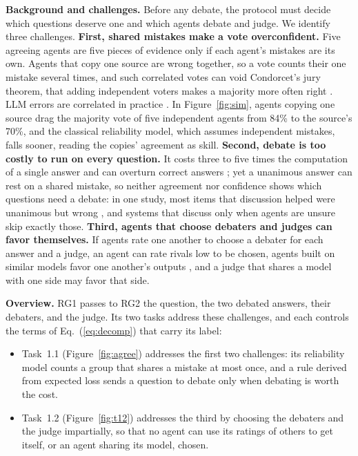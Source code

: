 \documentclass[12pt,letterpaper]{article}
\newcommand{\hd}[1]{\ifhmode\par\fi\addvspace{1pt}\noindent\textbf{#1}\hspace{0.35em}}
\begin{document}
\hd{Background and challenges.} Before any debate, the protocol must decide which questions deserve one and which agents debate and judge. We identify three challenges. \textbf{First, shared mistakes make a vote overconfident.} Five agreeing agents are five pieces of evidence only if each agent's mistakes are its own. Agents that copy one source are wrong together, so a vote counts their one mistake several times, and such correlated votes can void Condorcet's jury theorem, that adding independent voters makes a majority more often right \citep{ladha1992condorcet}. LLM errors are correlated in practice \citep{kim2025correlated,goel2025great,kohli2026nine}. In Figure~\ref{fig:sim}, agents copying one source drag the majority vote of five independent agents from 84\% to the source's 70\%, and the classical reliability model, which assumes independent mistakes, falls sooner, reading the copies' agreement as skill. \textbf{Second, debate is too costly to run on every question.} It costs three to five times the computation of a single answer and can overturn correct answers \citep{fan2026imad}; yet a unanimous answer can rest on a shared mistake, so neither agreement nor confidence shows which questions need a debate: in one study, most items that discussion helped were unanimous but wrong \citep{hu2026scouting}, and systems that discuss only when agents are unsure \citep{eo2025down} skip exactly those. \textbf{Third, agents that choose debaters and judges can favor themselves.} If agents rate one another to choose a debater for each answer and a judge, an agent can rate rivals low to be chosen, agents built on similar models favor one another's outputs \citep{panickssery2024self,goel2025great}, and a judge that shares a model with one side may favor that side.

\hd{Overview.} RG1 passes to RG2 the question, the two debated answers, their debaters, and the judge. Its two tasks address these challenges, and each controls the terms of Eq.~(\ref{eq:decomp}) that carry its label:
\begin{itemize}
\item Task~1.1 (Figure~\ref{fig:agree}) addresses the first two challenges: its reliability model counts a group that shares a mistake at most once, and a rule derived from expected loss sends a question to debate only when debating is worth the cost.
\item Task~1.2 (Figure~\ref{fig:t12}) addresses the third by choosing the debaters and the judge impartially, so that no agent can use its ratings of others to get itself, or an agent sharing its model, chosen.
\end{itemize}
\end{document}

